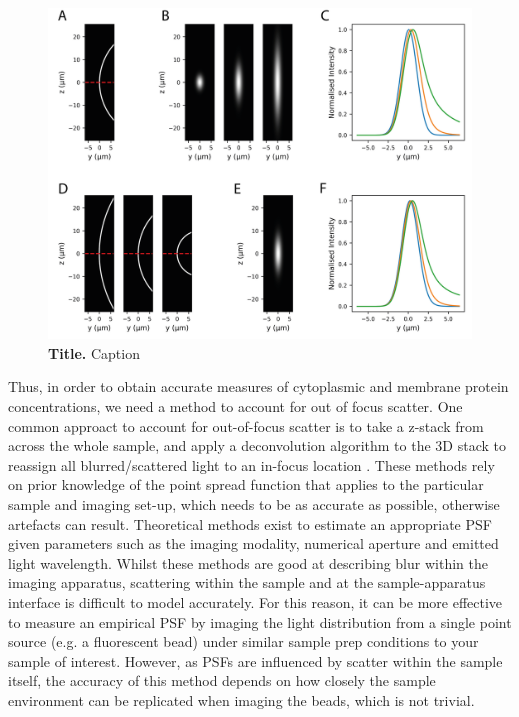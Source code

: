\documentclass[12pt]{"article"}
\newcommand{\mycaption}[2]{\caption[#1]{\textbf{#1.} #2}}
\begin{document}
\begin{figure}[!h]
\includegraphics[scale=0.9]{memquant_mem_psf}
\setlength{\abovecaptionskip}{20pt}
\centering
\mycaption{Title}{Caption}
\label{fig:memquant_mem_psf}
\end{figure}

Thus, in order to obtain accurate measures of cytoplasmic and membrane protein concentrations, we need a method to account for out of focus scatter. One common approact to account for out-of-focus scatter is to take a z-stack from across the whole sample, and apply a deconvolution algorithm to the 3D stack to reassign all blurred/scattered light to an in-focus location \citep{Wallace2001}. These methods rely on prior knowledge of the point spread function that applies to the particular sample and imaging set-up, which needs to be as accurate as possible, otherwise artefacts can result. Theoretical methods exist to estimate an appropriate PSF given parameters such as the imaging modality, numerical aperture and emitted light wavelength. Whilst these methods are good at describing blur within the imaging apparatus, scattering within the sample and at the sample-apparatus interface is difficult to model accurately. For this reason, it can be more effective to measure an empirical PSF by imaging the light distribution from a single point source (e.g. a fluorescent bead) under similar sample prep conditions to your sample of interest. However, as PSFs are influenced by scatter within the sample itself, the accuracy of this method depends on how closely the sample environment can be replicated when imaging the beads, which is not trivial. \\
\end{document}
